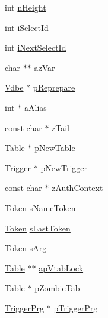 \begin{DoxyCompactItemize}
\item 
int \hyperlink{struct_parse_af4ec053d44a2a3bc8ae82b69a7327c3c}{n\-Height}
\item 
int \hyperlink{struct_parse_a7474fa0bf9ad160cbdf723406c306d9d}{i\-Select\-Id}
\item 
int \hyperlink{struct_parse_aab76240bd43c005941431179d4f9bf49}{i\-Next\-Select\-Id}
\item 
char $\ast$$\ast$ \hyperlink{struct_parse_a907e389eb399f3e76a0cc6b469e4e252}{az\-Var}
\item 
\hyperlink{struct_vdbe}{Vdbe} $\ast$ \hyperlink{struct_parse_a5e250f77353fb3df6660ff29ffa53790}{p\-Reprepare}
\item 
int $\ast$ \hyperlink{struct_parse_a5d59266be4e256238d3bbdf1a9ff7d5b}{a\-Alias}
\item 
const char $\ast$ \hyperlink{struct_parse_a14f58728b3ae2a297272510ae4bd9a89}{z\-Tail}
\item 
\hyperlink{struct_table}{Table} $\ast$ \hyperlink{struct_parse_a4788769c077dc86ffa3ee1e40ed6b4a1}{p\-New\-Table}
\item 
\hyperlink{struct_trigger}{Trigger} $\ast$ \hyperlink{struct_parse_a92ea8f2ac3190dd7c8360e0334ae78b3}{p\-New\-Trigger}
\item 
const char $\ast$ \hyperlink{struct_parse_a12c6e2fb69848bcc57169d44993c351f}{z\-Auth\-Context}
\item 
\hyperlink{struct_token}{Token} \hyperlink{struct_parse_afd929c54566cfc4d6f748fcc6b79b973}{s\-Name\-Token}
\item 
\hyperlink{struct_token}{Token} \hyperlink{struct_parse_ad499020d1bf06f3c98c8d36e2ceb83fd}{s\-Last\-Token}
\item 
\hyperlink{struct_token}{Token} \hyperlink{struct_parse_aa3fe38b31dd1cd0fbea4de0e77891642}{s\-Arg}
\item 
\hyperlink{struct_table}{Table} $\ast$$\ast$ \hyperlink{struct_parse_acdfd318c0f04ec640d6affc85ef8a009}{ap\-Vtab\-Lock}
\item 
\hyperlink{struct_table}{Table} $\ast$ \hyperlink{struct_parse_a4e8319f0a7f0d21e472c13ac6cf67060}{p\-Zombie\-Tab}
\item 
\hyperlink{struct_trigger_prg}{Trigger\-Prg} $\ast$ \hyperlink{struct_parse_a0891dbd3b583594c5d07d7b061026ea4}{p\-Trigger\-Prg}
\end{DoxyCompactItemize}


